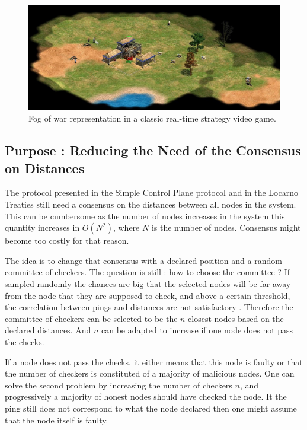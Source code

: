 \documentclass[a4paper,11pt,oneside]{report}
\begin{document}
\begin{figure}[!h] 
\centering
\includegraphics[width=400pt]{figures/fog_of_war}
\caption{Fog of war representation in a classic real-time strategy video game. }
\label{fig:fog-of-the-war}
\end{figure}

\subsection{Purpose : Reducing the Need of the Consensus on Distances}
The protocol presented in the Simple Control Plane protocol and in the Locarno
Treaties still need a consensus on the distances between all nodes in the system.
This can be cumbersome as the number of nodes increases in the system this
quantity increases in $O(N^2)$, where $N$ is the number of nodes. Consensus
might become too costly for that reason.

The idea is to change that consensus with a declared position and a random
committee of checkers. The question is still : how to choose the committee ? If
sampled randomly the chances are big that the selected nodes will be far away
from the node that they are supposed to check, and above a certain threshold, the correlation between pings
and distances are not satisfactory \cite{Katz-bassett2006}. Therefore the committee of checkers can be
selected to be the $n$ closest nodes based on the declared distances. And $n$
can be adapted to increase if one node does not pass the checks. 

If a node does not pass the checks, it either means that this node is faulty or
that the number of checkers is constituted of a majority of malicious nodes.
One can solve the second problem by increasing the number of checkers $n$, and
progressively a majority of honest nodes should have checked the node. It the
ping still does not correspond to what the node declared then one might assume
that the node itself is faulty. 
\end{document}
